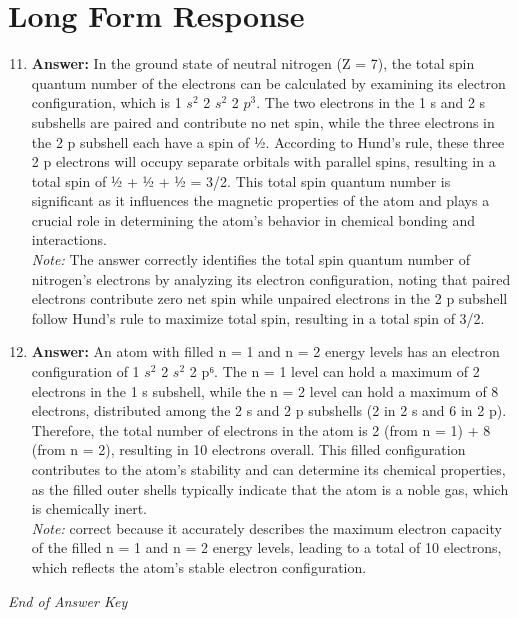 \documentclass[12pt]{article}
\begin{document}
\section*{Long Form Response}
\begin{enumerate}[label=\arabic*.]
\setcounter{enumi}{10}
\item \textbf{Answer:} In the ground state of neutral nitrogen (Z = 7), the total spin quantum number of the electrons can be calculated by examining its electron configuration, which is 1 $s^2$ 2 $s^2$ 2 $p^3$. The two electrons in the 1 s and 2 s subshells are paired and contribute no net spin, while the three electrons in the 2 p subshell each have a spin of ½. According to Hund's rule, these three 2 p electrons will occupy separate orbitals with parallel spins, resulting in a total spin of ½ + ½ + ½ = 3/2. This total spin quantum number is significant as it influences the magnetic properties of the atom and plays a crucial role in determining the atom's behavior in chemical bonding and interactions.
\\ \textit{Note:} The answer correctly identifies the total spin quantum number of nitrogen's electrons by analyzing its electron configuration, noting that paired electrons contribute zero net spin while unpaired electrons in the 2 p subshell follow Hund's rule to maximize total spin, resulting in a total spin of 3/2.
\item \textbf{Answer:} An atom with filled n = 1 and n = 2 energy levels has an electron configuration of 1 $s^2$ 2 $s^2$ 2 p⁶. The n = 1 level can hold a maximum of 2 electrons in the 1 s subshell, while the n = 2 level can hold a maximum of 8 electrons, distributed among the 2 s and 2 p subshells (2 in 2 s and 6 in 2 p). Therefore, the total number of electrons in the atom is 2 (from n = 1) + 8 (from n = 2), resulting in 10 electrons overall. This filled configuration contributes to the atom's stability and can determine its chemical properties, as the filled outer shells typically indicate that the atom is a noble gas, which is chemically inert.
\\ \textit{Note:} correct because it accurately describes the maximum electron capacity of the filled n = 1 and n = 2 energy levels, leading to a total of 10 electrons, which reflects the atom's stable electron configuration.
\end{enumerate}

\vfill
\noindent\textit{End of Answer Key}
\end{document}
